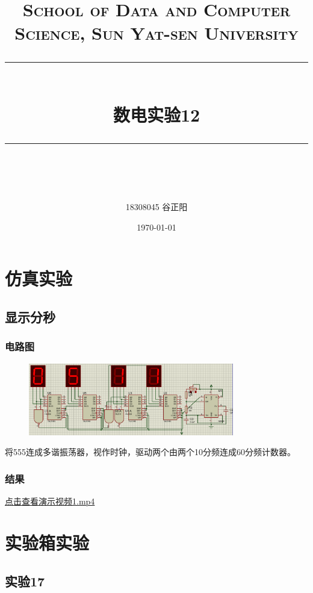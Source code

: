 \documentclass[UTF8, a4paper, 11pt]{article}
\title{	
\normalfont \normalsize
\textsc{School of Data and Computer Science, Sun Yat-sen University} \\ [25pt] %
\rule{\textwidth}{0.5pt} \\[0.4cm] %
\huge 数电实验12\\ %
\rule{\textwidth}{2pt} \\[0.5cm] %
\author{18308045 谷正阳}
\date{\normalsize\today}
}
\begin{document}
\maketitle
\tableofcontents
\newpage
\section{仿真实验}
\subsection{显示分秒}
\subsubsection{电路图}
\begin{figure}[H]
    \centering
    \includegraphics[width=0.8\textwidth]{ex12.1电路图.png}
\end{figure}
将555连成多谐振荡器，视作时钟，驱动两个由两个10分频连成60分频计数器。
\subsubsection{结果}
\href{run:./1.mp4}{点击查看演示视频1.mp4}
\section{实验箱实验}
\subsection{实验17}
\end{document}
